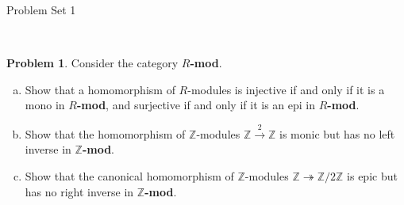 \documentclass[11pt]{article}
\title{}
\date{\vspace{-0.5in}}
\newcommand{\Z}{\mathbb{Z}}
\theoremstyle{definition}
\newtheorem{problem}{Problem}
\begin{document}
\thispagestyle{fancy}
\pagestyle{fancy}

\vspace{3em}

\begin{center}
	{\LARGE Problem Set 1}
\end{center}

%
%
%


\


\begin{problem}
Consider the category {\bf $R$-mod}.

\begin{enumerate}[a)]
\item Show that a homomorphism of $R$-modules is injective if and only if it is a mono in {\bf $R$-mod}, and surjective if and only if it is an epi in {\bf $R$-mod}.

\item Show that the homomorphism of $\Z$-modules $\Z \xrightarrow{2} \Z$ is monic but has no left inverse in {\bf $\Z$-mod}.

\item Show that the canonical homomorphism of $\Z$-modules $\Z \twoheadrightarrow \Z/2\Z$ is epic but has no right inverse in {\bf $\Z$-mod}.
\end{enumerate}
\end{problem}
\end{document}
